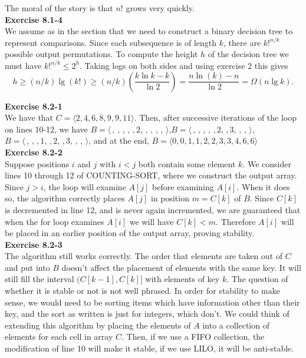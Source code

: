 \documentclass{article}
\begin{document}
The moral of the story is that $n!$ grows very quickly.\\

\noindent\textbf{Exercise 8.1-4}\\

We assume as in the section that we need to construct a binary decision tree to represent comparisons.  Since each subsequence is of length $k$, there are $k!^{n/k}$ possible output permutations. To compute the height $h$ of the decision tree we must have $k!^{n/k} \leq 2^h$.  Taking logs on both sides and using exercise 2 this gives
\[ h \geq (n/k)\lg(k!) \geq (n/k)\left(\frac{k\ln k - k}{\ln 2}\right) = \frac{n\ln(k) - n}{\ln 2} = \Omega(n \lg k).\]

\noindent\textbf{Exercise 8.2-1}\\

We have that $C = \langle 2, 4,6,8,9,9,11\rangle$. Then, after successive iterations of the loop on lines 10-12, we have $B = \langle\,,\,,\,,\,,\,,2,\,,\,,\,,\,,\,\rangle$,$B = \langle\,,\,,\,,\,,\,,2,\,,3,\,,\,,\,\rangle$,$B = \langle\,,\,,\,,1,\,,2,\,,3,\,,\,,\,\rangle$, and at the end, $B = \langle0,0,1,1,2,2,3,3,4,6,6\rangle$\\

\noindent\textbf{Exercise 8.2-2}\\

Suppose positions $i$ and $j$ with $i < j$ both contain some element $k$.  We consider lines 10 through 12 of COUNTING-SORT, where we construct the output array.  Since $j > i$, the loop will examine $A[j]$ before examining $A[i]$.  When it does so, the algorithm correctly places $A[j]$ in position $m = C[k]$ of $B$.  Since $C[k]$ is decremented in line 12, and is never again incremented, we are guaranteed that when the for loop examines $A[i]$ we will have $C[k]< m$.  Therefore $A[i]$ will be placed in an earlier position of the output array, proving stability. \\

\noindent\textbf{Exercise 8.2-3}\\

The algorithm still works correctly. The order that elements are taken out of $C$ and put into $B$ doesn't affect the placement of elements with the same key. It will still fill the interval $(C[k-1],C[k]]$ with elements of key $k$. The question of whether it is stable or not is not well phrased. In order for stability to make sense, we would need to be sorting items which have information other than their key, and the sort as written is just for integers, which don't. We could think of extending this algorithm by placing the elements of $A$ into a collection of elements for each cell in array $C$. Then, if we use a FIFO collection, the modification of line 10 will make it stable, if we use LILO, it will be anti-stable.\\
\end{document}
